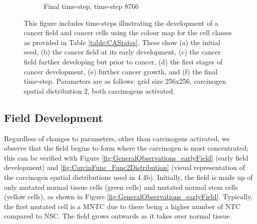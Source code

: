 \documentclass[\main/thesis.tex]{subfiles}
\begin{document}
\begin{figure}[H]
\begin{subfigure}[t]{.45\textwidth}
      \caption{Final time-step, time-step 8766}
      \label{fig:GeneralObservations_final}
    \end{subfigure}
    \caption{This figure includes time-steps illustrating the development of a cancer field and cancer cells using the colour map for the cell classes as provided in Table \ref{table:CAStates}. These show (a) the initial seed, (b) the cancer field at its early development, (c) the cancer field further developing but prior to cancer, (d) the first stages of cancer development, (e) further cancer growth, and (f) the final time-step. Parameters are as follows: grid size 256x256, carcinogen spatial distribution 2, both carcinogens activated.}
    \label{fig:GeneralObservations_importantTimeSteps}
\end{figure}

\subsection{Field Development}
Regardless of changes to parameters, other than carcinogens activated, we observe that the field begins to form where the carcinogen is most concentrated; this can be verified with Figure \ref{fig:GeneralObservations_earlyField} (early field development) and \ref{fig:CarcinFunc_Func2Distribution} (visual representation of the carcinogen spatial distributions used in 4.4b). Initially, the field is made up of only mutated normal tissue cells (green cells) and mutated normal stem cells (yellow cells), as shown in Figure \ref{fig:GeneralObservations_earlyField}. Typically, the first mutated cell is a MNTC due to there being a higher number of NTC compared to NSC. The field grows outwards as it takes over normal tissue. 
 
\end{document}
